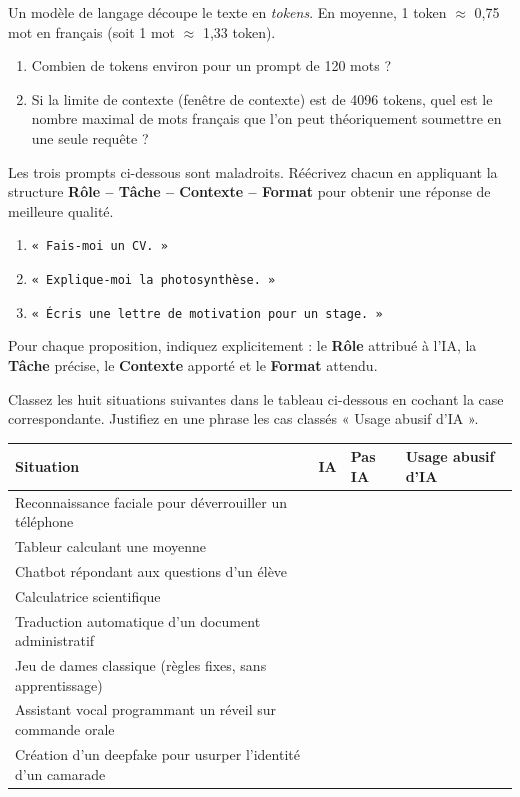 \documentclass[11pt]{article}
\newcounter{popsec}
\newcounter{popsub}
\newcommand{\courssub}[1]{%
  \stepcounter{popsub}%
  \par\vspace{9pt}\noindent{\popxbold\fontsize{11.5}{13}\selectfont\color{popink}{\color{poporange}\thepopsec.\thepopsub}\hspace{6pt}#1}\par\nopagebreak\vspace{4pt}
}
\begin{document}
\begin{exercice}
Un modèle de langage découpe le texte en \emph{tokens}. En moyenne, 1 token $\approx$ 0,75 mot en français (soit 1 mot $\approx$ 1,33 token).
\begin{enumerate}
    \item Combien de tokens environ pour un prompt de 120 mots ?
    \item Si la limite de contexte (fenêtre de contexte) est de 4096 tokens, quel est le nombre maximal de mots français que l'on peut théoriquement soumettre en une seule requête ?
\end{enumerate}
\end{exercice}

\courssub{Je m'entraîne}

\begin{exercice}
Les trois prompts ci-dessous sont maladroits. Réécrivez chacun en appliquant la structure \textbf{Rôle -- Tâche -- Contexte -- Format} pour obtenir une réponse de meilleure qualité.
\begin{enumerate}
    \item \texttt{« Fais-moi un CV. »}
    \item \texttt{« Explique-moi la photosynthèse. »}
    \item \texttt{« Écris une lettre de motivation pour un stage. »}
\end{enumerate}
Pour chaque proposition, indiquez explicitement : le \textbf{Rôle} attribué à l'IA, la \textbf{Tâche} précise, le \textbf{Contexte} apporté et le \textbf{Format} attendu.
\end{exercice}

\begin{exercice}
Classez les huit situations suivantes dans le tableau ci-dessous en cochant la case correspondante. Justifiez en une phrase les cas classés « Usage abusif d'IA ».
\begin{center}
\begin{tabularx}{\linewidth}{|l|X|X|X|}
\hline
\textbf{Situation} & \textbf{IA} & \textbf{Pas IA} & \textbf{Usage abusif d'IA} \\ \hline
Reconnaissance faciale pour déverrouiller un téléphone & & & \\ \hline
Tableur calculant une moyenne & & & \\ \hline
Chatbot répondant aux questions d'un élève & & & \\ \hline
Calculatrice scientifique & & & \\ \hline
Traduction automatique d'un document administratif & & & \\ \hline
Jeu de dames classique (règles fixes, sans apprentissage) & & & \\ \hline
Assistant vocal programmant un réveil sur commande orale & & & \\ \hline
Création d'un deepfake pour usurper l'identité d'un camarade & & & \\ \hline
\end{tabularx}
\end{center}
\end{exercice}
\end{document}
